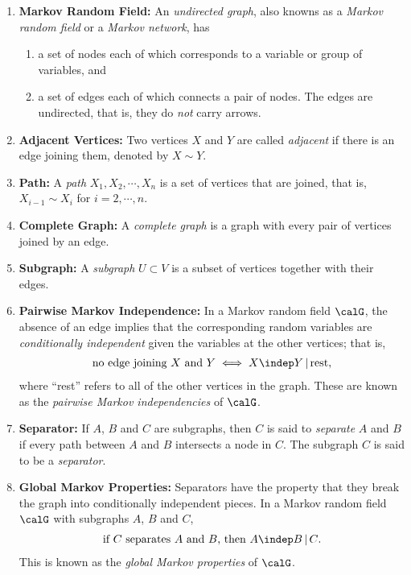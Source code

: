 \documentclass[12pt]{article}
\begin{document}
\begin{enumerate}[label=\textbf{\arabic*.}]

	\item \textbf{Markov Random Field:} An \emph{undirected graph}, also knowns as a \emph{Markov random field} or a \emph{Markov network}, has 
	\begin{enumerate}
		\item a set of nodes each of which corresponds to a variable or group of variables, and 
		\item a set of edges each of which connects a pair of nodes. The edges are undirected, that is, they do \emph{not} carry arrows. 
	\end{enumerate}
	
	\item \textbf{Adjacent Vertices:} Two vertices $X$ and $Y$ are called \textit{adjacent} if there is an edge joining them, denoted by $X \sim Y$. 
	
	\item \textbf{Path:} A \textit{path} $X_1, X_2, \cdots, X_n$ is a set of vertices that are joined, that is, $X_{i-1} \sim X_i$ for $i = 2, \cdots, n$. 
	
	\item \textbf{Complete Graph:} A \textit{complete graph} is a graph with every pair of vertices joined by an edge. 
	
	\item \textbf{Subgraph:} A \textit{subgraph} $U \subset V$ is a subset of vertices together with their edges. 
	
	\item \textbf{Pairwise Markov Independence:} In a Markov random field $\calG$, the absence of an edge implies that the corresponding random variables are \textit{conditionally independent} given the variables at the other vertices; that is, 
	\begin{align}
		\text{no edge joining } X \text{ and } Y \iff X \indep Y \,\vert\, \text{rest}, 
	\end{align}
	where ``rest'' refers to all of the other vertices in the graph. These are known as the \emph{pairwise Markov independencies} of $\calG$. 
	
	\item \textbf{Separator:} If $A$, $B$ and $C$ are subgraphs, then $C$ is said to \textit{separate} $A$ and $B$ if every path between $A$ and $B$ intersects a node in $C$. The subgraph $C$ is said to be a \textit{separator}. 
	
	\item \textbf{Global Markov Properties:} Separators have the property that they break the graph into conditionally independent pieces. In a Markov random field $\calG$ with subgraphs $A$, $B$ and $C$, 
	\begin{align}
		\text{if $C$ separates $A$ and $B$, then $A \indep B \,\vert\, C$.}
	\end{align}
	This is known as the \textit{global Markov properties} of $\calG$. 
	

\end{enumerate}
\end{document}
